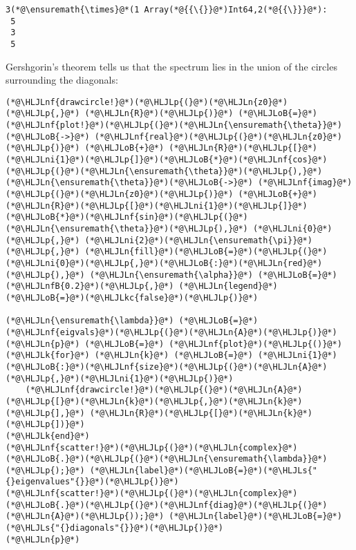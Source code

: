 \documentclass[12pt,a4paper]{article}
\newcommand{\HLJLk}[1]{\textcolor[RGB]{148,91,176}{\textbf{#1}}}
\newcommand{\HLJLkc}[1]{\textcolor[RGB]{59,151,46}{\textit{#1}}}
\newcommand{\HLJLn}[1]{#1}
\newcommand{\HLJLnf}[1]{\textcolor[RGB]{66,102,213}{#1}}
\newcommand{\HLJLs}[1]{\textcolor[RGB]{201,61,57}{#1}}
\newcommand{\HLJLnfB}[1]{\textcolor[RGB]{59,151,46}{#1}}
\newcommand{\HLJLni}[1]{\textcolor[RGB]{59,151,46}{#1}}
\newcommand{\HLJLoB}[1]{\textcolor[RGB]{102,102,102}{\textbf{#1}}}
\newcommand{\HLJLp}[1]{#1}
\begin{document}
\begin{lstlisting}
3(*@\ensuremath{\times}@*(1 Array(*@{{\{}}@*)Int64,2(*@{{\}}}@*):
 5
 3
 5
\end{lstlisting}


Gershgorin's theorem tells us that the spectrum lies in the union of the circles surrounding the diagonals:


\begin{lstlisting}
(*@\HLJLnf{drawcircle!}@*)(*@\HLJLp{(}@*)(*@\HLJLn{z0}@*)(*@\HLJLp{,}@*) (*@\HLJLn{R}@*)(*@\HLJLp{)}@*) (*@\HLJLoB{=}@*) (*@\HLJLnf{plot!}@*)(*@\HLJLp{(}@*)(*@\HLJLn{\ensuremath{\theta}}@*)(*@\HLJLoB{->}@*) (*@\HLJLnf{real}@*)(*@\HLJLp{(}@*)(*@\HLJLn{z0}@*)(*@\HLJLp{)}@*) (*@\HLJLoB{+}@*) (*@\HLJLn{R}@*)(*@\HLJLp{[}@*)(*@\HLJLni{1}@*)(*@\HLJLp{]}@*)(*@\HLJLoB{*}@*)(*@\HLJLnf{cos}@*)(*@\HLJLp{(}@*)(*@\HLJLn{\ensuremath{\theta}}@*)(*@\HLJLp{),}@*) (*@\HLJLn{\ensuremath{\theta}}@*)(*@\HLJLoB{->}@*) (*@\HLJLnf{imag}@*)(*@\HLJLp{(}@*)(*@\HLJLn{z0}@*)(*@\HLJLp{)}@*) (*@\HLJLoB{+}@*) (*@\HLJLn{R}@*)(*@\HLJLp{[}@*)(*@\HLJLni{1}@*)(*@\HLJLp{]}@*)(*@\HLJLoB{*}@*)(*@\HLJLnf{sin}@*)(*@\HLJLp{(}@*)(*@\HLJLn{\ensuremath{\theta}}@*)(*@\HLJLp{),}@*) (*@\HLJLni{0}@*)(*@\HLJLp{,}@*) (*@\HLJLni{2}@*)(*@\HLJLn{\ensuremath{\pi}}@*)(*@\HLJLp{,}@*) (*@\HLJLn{fill}@*)(*@\HLJLoB{=}@*)(*@\HLJLp{(}@*)(*@\HLJLni{0}@*)(*@\HLJLp{,}@*)(*@\HLJLoB{:}@*)(*@\HLJLn{red}@*)(*@\HLJLp{),}@*) (*@\HLJLn{\ensuremath{\alpha}}@*) (*@\HLJLoB{=}@*) (*@\HLJLnfB{0.2}@*)(*@\HLJLp{,}@*) (*@\HLJLn{legend}@*)(*@\HLJLoB{=}@*)(*@\HLJLkc{false}@*)(*@\HLJLp{)}@*)

(*@\HLJLn{\ensuremath{\lambda}}@*) (*@\HLJLoB{=}@*) (*@\HLJLnf{eigvals}@*)(*@\HLJLp{(}@*)(*@\HLJLn{A}@*)(*@\HLJLp{)}@*)
(*@\HLJLn{p}@*) (*@\HLJLoB{=}@*) (*@\HLJLnf{plot}@*)(*@\HLJLp{()}@*)
(*@\HLJLk{for}@*) (*@\HLJLn{k}@*) (*@\HLJLoB{=}@*) (*@\HLJLni{1}@*)(*@\HLJLoB{:}@*)(*@\HLJLnf{size}@*)(*@\HLJLp{(}@*)(*@\HLJLn{A}@*)(*@\HLJLp{,}@*)(*@\HLJLni{1}@*)(*@\HLJLp{)}@*)
    (*@\HLJLnf{drawcircle!}@*)(*@\HLJLp{(}@*)(*@\HLJLn{A}@*)(*@\HLJLp{[}@*)(*@\HLJLn{k}@*)(*@\HLJLp{,}@*)(*@\HLJLn{k}@*)(*@\HLJLp{],}@*) (*@\HLJLn{R}@*)(*@\HLJLp{[}@*)(*@\HLJLn{k}@*)(*@\HLJLp{])}@*)
(*@\HLJLk{end}@*)
(*@\HLJLnf{scatter!}@*)(*@\HLJLp{(}@*)(*@\HLJLn{complex}@*)(*@\HLJLoB{.}@*)(*@\HLJLp{(}@*)(*@\HLJLn{\ensuremath{\lambda}}@*)(*@\HLJLp{);}@*) (*@\HLJLn{label}@*)(*@\HLJLoB{=}@*)(*@\HLJLs{"{}eigenvalues"{}}@*)(*@\HLJLp{)}@*)
(*@\HLJLnf{scatter!}@*)(*@\HLJLp{(}@*)(*@\HLJLn{complex}@*)(*@\HLJLoB{.}@*)(*@\HLJLp{(}@*)(*@\HLJLnf{diag}@*)(*@\HLJLp{(}@*)(*@\HLJLn{A}@*)(*@\HLJLp{));}@*) (*@\HLJLn{label}@*)(*@\HLJLoB{=}@*)(*@\HLJLs{"{}diagonals"{}}@*)(*@\HLJLp{)}@*)
(*@\HLJLn{p}@*)
\end{lstlisting}
\end{document}
